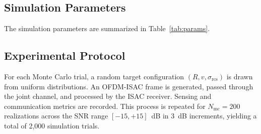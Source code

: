 \documentclass[conference]{IEEEtran}
\begin{document}
\subsection{Simulation Parameters}

The simulation parameters are summarized in Table~\ref{tab:params}.

\begin{table}[t]
\caption{Simulation Parameters}
\label{tab:params}
\centering
{}
\end{table}

\subsection{Experimental Protocol}

For each Monte Carlo trial, a random target configuration $(R, v, \sigma_{\mathrm{rcs}})$ is drawn from uniform distributions. An OFDM-ISAC frame is generated, passed through the joint channel, and processed by the ISAC receiver. Sensing and communication metrics are recorded. This process is repeated for $N_{\mathrm{mc}} = 200$ realizations across the SNR range $[-15, +15]$~dB in 3~dB increments, yielding a total of 2,000 simulation trials.

\end{document}
